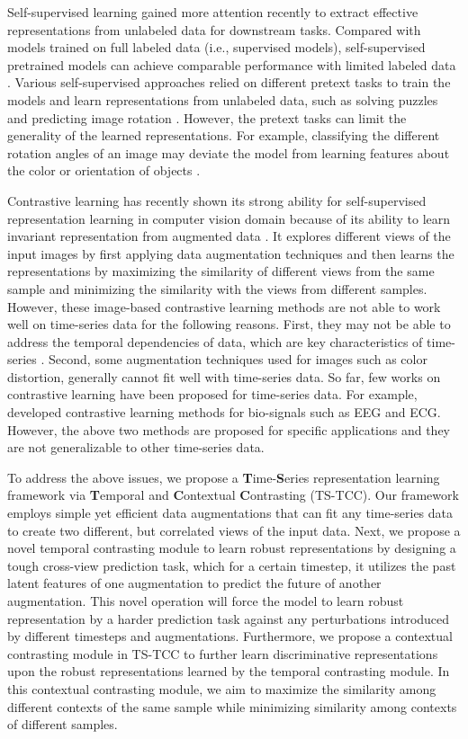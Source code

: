 \documentclass{article}
\begin{document}
Self-supervised learning gained more attention recently to extract effective representations from unlabeled data for downstream tasks. Compared with models trained on full labeled data (i.e., supervised models), self-supervised pretrained models can achieve comparable performance with limited labeled data \cite{chen2020simple}. Various self-supervised approaches relied on different pretext tasks to train the models and learn representations from unlabeled data, such as solving puzzles \cite{puzzle} and predicting image rotation \cite{gidaris:unsupervised}. However, the pretext tasks can limit the generality of the learned representations. For example, classifying the different rotation angles of an image may deviate the model from learning features about the color or orientation of objects \cite{oord2018representation}.

Contrastive learning has recently shown its strong ability for self-supervised representation learning in computer vision domain because of its ability to learn invariant representation from augmented data  \cite{hjelm2018learning,He_2020_CVPR,chen2020simple}. It explores different views of the input images by first applying data augmentation techniques and then learns the representations by maximizing the similarity of different views from the same sample and minimizing the similarity with the views from different samples. However, these image-based contrastive learning methods are not able to work well on time-series data for the following reasons. First, they may not be able to address the temporal dependencies of data, which are key characteristics of time-series \cite{NEURIPS2019_53c6de78}. Second, some augmentation techniques used for images such as color distortion, generally cannot fit well with time-series data. So far, few works on contrastive learning have been proposed for time-series data. For example, \cite{mohsenvand20a,cheng2020subject} developed contrastive learning methods for bio-signals such as EEG and ECG. However, the above two methods are proposed for specific applications and they are not generalizable to other time-series data.

To address the above issues, we propose a \textbf{T}ime-\textbf{S}eries representation learning framework via \textbf{T}emporal and \textbf{C}ontextual \textbf{C}ontrasting (TS-TCC). Our framework employs simple yet efficient data augmentations that can fit any time-series data to create two different, but correlated views of the input data. Next, we propose a novel temporal contrasting module to learn robust representations by designing a tough cross-view prediction task, which for a certain timestep, it utilizes the past latent features of one augmentation to predict the future of another augmentation. This novel operation will force the model to learn robust representation by a harder prediction task against any perturbations introduced by different timesteps and augmentations. 
Furthermore, we propose a contextual contrasting module in TS-TCC to further learn discriminative representations upon the robust representations learned by the temporal contrasting module. 
In this contextual contrasting module, we aim to maximize the similarity among different contexts of the same sample while minimizing similarity among contexts of different samples.
\end{document}
